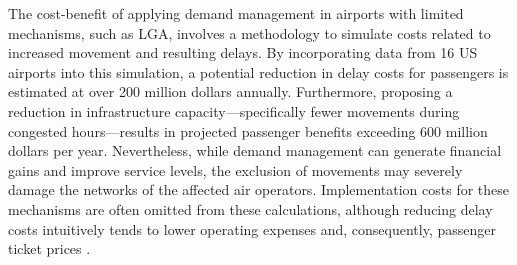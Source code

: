 
The cost-benefit of applying demand management in airports with limited
mechanisms, such as \acrshort{LGA}, involves a methodology to simulate costs
related to increased movement and resulting delays.
%
By incorporating data from 16 US airports into this simulation, a potential
reduction in delay costs for passengers is estimated at over 200 million dollars
annually.
%
Furthermore, proposing a reduction in infrastructure capacity—specifically fewer
movements during congested hours—results in projected passenger benefits
exceeding 600 million dollars per year.
%
Nevertheless, while demand management can generate financial gains and improve
service levels, the exclusion of movements may severely damage the networks of
the affected air operators.
%
Implementation costs for these mechanisms are often omitted from these
calculations, although reducing delay costs intuitively tends to lower operating
expenses and, consequently, passenger ticket prices \cite{swaroop2012more}.
%



